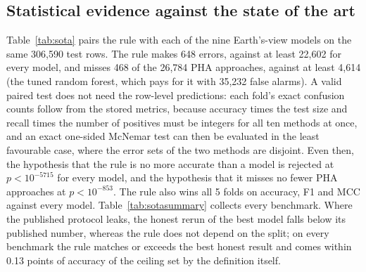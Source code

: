 \documentclass[make,article,submit,moreauthors]{Definitions/mdpi}
\begin{document}
\subsection{Statistical evidence against the state of the art}
Table~\ref{tab:sota} pairs the rule with each of the nine Earth's-view models on the same 306,590 test rows. The rule makes 648 errors, against at least 22,602 for every model, and misses 468 of the 26,784 PHA approaches, against at least 4,614 (the tuned random forest, which pays for it with 35,232 false alarms). A valid paired test does not need the row-level predictions: each fold's exact confusion counts follow from the stored metrics, because accuracy times the test size and recall times the number of positives must be integers for all ten methods at once, and an exact one-sided McNemar test can then be evaluated in the least favourable case, where the error sets of the two methods are disjoint. Even then, the hypothesis that the rule is no more accurate than a model is rejected at $p<10^{-5715}$ for every model, and the hypothesis that it misses no fewer PHA approaches at $p<10^{-853}$. The rule also wins all 5 folds on accuracy, F1 and MCC against every model. Table~\ref{tab:sotasummary} collects every benchmark. Where the published protocol leaks, the honest rerun of the best model falls below its published number, whereas the rule does not depend on the split; on every benchmark the rule matches or exceeds the best honest result and comes within 0.13 points of accuracy of the ceiling set by the definition itself.
\end{document}
